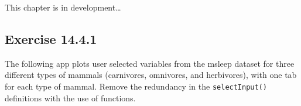 \documentclass[]{book}
\begin{document}
\begin{TODO}

This chapter is in development\ldots{}

\end{TODO}

\hypertarget{exercise-14.4.1}{%
\subsection*{Exercise 14.4.1}\label{exercise-14.4.1}}

The following app plots user selected variables from the msleep dataset for three different types of mammals (carnivores, omnivores, and herbivores), with one tab for each type of mammal. Remove the redundancy in the \texttt{selectInput()} definitions with the use of functions.
\end{document}

